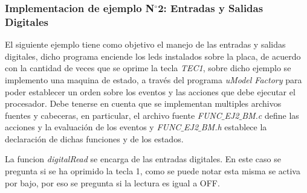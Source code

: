 \documentclass[12pt,letterpaper]{article}
\begin{document}
\subsubsection{Implementacion de ejemplo N$^{\circ}$2: Entradas y Salidas Digitales}\label{sec:ej2BM}

El siguiente ejemplo tiene como objetivo el manejo de las entradas y salidas digitales, dicho programa enciende los leds instalados sobre la placa, de acuerdo con la cantidad de veces que se oprime la tecla \textit{TEC1}, sobre dicho ejemplo se implemento una maquina de estado, a través del programa \textit{uModel Factory} para poder establecer un orden sobre los eventos y las acciones que debe ejecutar el procesador. Debe tenerse en cuenta que se implementan multiples archivos fuentes y cabeceras, en particular, el archivo fuente \textit{FUNC$\_$EJ2$\_$BM.c} define las acciones y la evaluación de los eventos y \textit{FUNC$\_$EJ2$\_$BM.h} establece la declaración de dichas funciones y de los estados.

La funcion \textit{digitalRead} se encarga de las entradas digitales. En este caso se pregunta  si se ha oprimido la tecla 1, como se puede notar esta misma se activa por bajo, por eso se pregunta si la lectura es igual a OFF.
\end{document}
